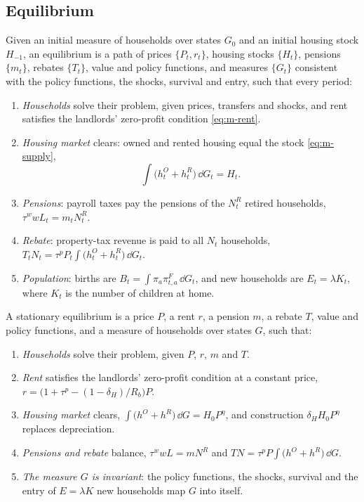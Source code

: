 \subsection{Equilibrium}
\label{sec:m-equilibrium}

\begin{definition}
Given an initial measure of households over states $G_0$ and an initial housing stock $H_{-1}$, an equilibrium is
a path of prices $\{P_t,r_t\}$, housing stocks $\{H_t\}$, pensions $\{m_t\}$, rebates $\{T_t\}$, value
and policy functions, and measures $\{G_t\}$ consistent with the policy
functions, the shocks, survival and entry, such that every period:
\begin{enumerate}
\item \emph{Households} solve their problem, given prices, transfers and
shocks, and rent satisfies the landlords' zero-profit condition
\eqref{eq:m-rent}.
\item \emph{Housing market} clears: owned and rented housing equal the stock \eqref{eq:m-supply},
\[
 \int\bigl(h^O_t+h^R_t\bigr)\,\dd G_t=H_t .
\]
\item \emph{Pensions}: payroll taxes pay the pensions of the $N^R_t$ retired
households, $\tau^wwL_t=m_tN^R_t$.
\item \emph{Rebate}: property-tax revenue is paid to all $N_t$ households,
$T_tN_t=\tau^pP_t\int\bigl(h^O_t+h^R_t\bigr)\,\dd G_t$.
\item \emph{Population}: births are $B_t=\int\pi_a\pi^F_{t,a}\,\dd G_t$, and
new households are $E_t=\lambda K_t$, where $K_t$ is the number of children
at home.
\end{enumerate}
\end{definition}

\begin{definition}
A stationary equilibrium is a price $P$, a rent $r$, a pension $m$, a rebate
$T$, value and policy functions, and a measure of households over states
$G$, such that:
\begin{enumerate}
\item \emph{Households} solve their problem, given $P$, $r$, $m$ and $T$.
\item \emph{Rent} satisfies the landlords' zero-profit condition at a
constant price, $r=\bigl(1+\tau^p-(1-\delta_H)/R_b\bigr)P$.
\item \emph{Housing market} clears,
$\int\bigl(h^O+h^R\bigr)\,\dd G=H_0P^{\eta}$, and construction $\delta_HH_0P^{\eta}$ replaces depreciation.
\item \emph{Pensions and rebate} balance, $\tau^wwL=mN^R$ and
$TN=\tau^pP\int\bigl(h^O+h^R\bigr)\,\dd G$.
\item \emph{The measure $G$ is invariant}: the policy functions, the shocks,
survival and the entry of $E=\lambda K$ new households map $G$ into itself.
\end{enumerate}
\end{definition}

